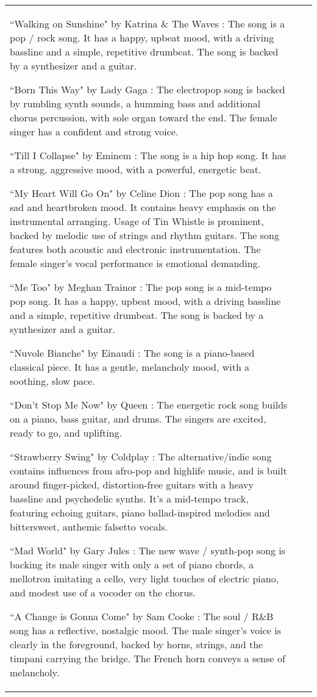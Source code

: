 \documentclass[nohyperref]{article}
\theoremstyle{plain}
\theoremstyle{definition}
\theoremstyle{remark}
\begin{document}
\begin{table}[t!]
{\begin{tabular}{lrr}
``Walking on Sunshine" by Katrina \& The Waves :
The song is a pop / rock song. It has a happy, upbeat mood, with a driving bassline and a simple, repetitive drumbeat. The song is backed by a synthesizer and a guitar. 

``Born This Way" by Lady Gaga :
The electropop song is backed by rumbling synth sounds, a humming bass and additional chorus percussion, with sole organ toward the end. The female singer has a confident and strong voice. 

``Till I Collapse" by Eminem :
The song is a hip hop song. It has a strong, aggressive mood, with a powerful, energetic beat. 

``My Heart Will Go On" by Celine Dion :
The pop song has a sad and heartbroken mood. It contains heavy emphasis on the instrumental arranging. Usage of Tin Whistle is prominent, backed by melodic use of strings and rhythm guitars. The song features both acoustic and electronic instrumentation. The female singer's vocal performance is emotional demanding. 

``Me Too" by Meghan Trainor :
The pop song is a mid-tempo pop song. It has a happy, upbeat mood, with a driving bassline and a simple, repetitive drumbeat. The song is backed by a synthesizer and a guitar. 

``Nuvole Bianche" by Einaudi :
The song is a piano-based classical piece. It has a gentle, melancholy mood, with a soothing, slow pace. 

``Don't Stop Me Now" by Queen :
The energetic rock song builds on a piano, bass guitar, and drums. The singers are excited, ready to go, and uplifting. 

``Strawberry Swing" by Coldplay :
The alternative/indie song contains influences from afro-pop and highlife music, and is built around finger-picked, distortion-free guitars with a heavy bassline and psychedelic synths. It's a mid-tempo track, featuring echoing guitars, piano ballad-inspired melodies and bittersweet, anthemic falsetto vocals. 

``Mad World" by Gary Jules :
The new wave / synth-pop song is backing its male singer with only a set of piano chords, a mellotron imitating a cello, very light touches of electric piano, and modest use of a vocoder on the chorus. 

``A Change is Gonna Come" by Sam Cooke :
The soul / R\&B song has a reflective, nostalgic mood. The male singer's voice is clearly in the foreground, backed by horns, strings, and the timpani carrying the bridge. The French horn conveys a sense of melancholy. 


\end{tabular}}
\end{table}
\end{document}
